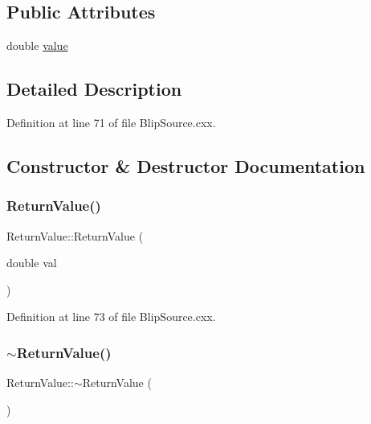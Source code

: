 \subsection*{Public Attributes}
\begin{DoxyCompactItemize}
\item 
double \hyperlink{struct_return_value_a46feee1ef2a062fef2e3451a6f61a47e}{value}
\end{DoxyCompactItemize}


\subsection{Detailed Description}


Definition at line 71 of file Blip\+Source.\+cxx.



\subsection{Constructor \& Destructor Documentation}
\mbox{\label{struct_return_value_a3074279ed256384587f4223a7fe0983c}} 
\subsubsection{\texorpdfstring{Return\+Value()}{ReturnValue()}}
{\footnotesize\ttfamily Return\+Value\+::\+Return\+Value (\begin{DoxyParamCaption}\item[{double}]{val }\end{DoxyParamCaption})\hspace{0.3cm}{\ttfamily [inline]}}



Definition at line 73 of file Blip\+Source.\+cxx.

\mbox{\label{struct_return_value_ada354eefee65d4309362b092f19dc86e}} 
\subsubsection{\texorpdfstring{$\sim$\+Return\+Value()}{~ReturnValue()}}
{\footnotesize\ttfamily Return\+Value\+::$\sim$\+Return\+Value (\begin{DoxyParamCaption}{ }\end{DoxyParamCaption})\hspace{0.3cm}{\ttfamily [inline]}}



